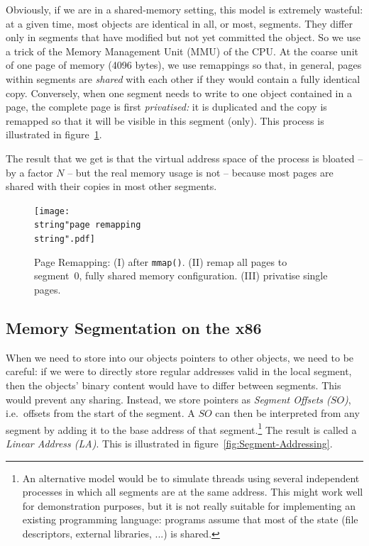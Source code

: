 \documentclass{sigplanconf}
\begin{document}
Obviously, if we are in a shared-memory setting, this model is extremely
wasteful: at a given time, most objects are identical in all, or most,
segments.  They differ only in segments that have modified but not yet
committed the object.  So we use a trick of the Memory Management Unit
(MMU) of the CPU.  At the coarse unit of one page of memory (4096
bytes), we use remappings so that, in general, pages within segments are
\emph{shared} with each other if they would contain a fully identical
copy.  Conversely, when one segment needs to write to one object
contained in a page, the complete page is first \emph{privatised:} it is
duplicated and the copy is remapped so that it will be visible in this
segment (only).  This process is illustrated in
figure~\ref{fig:Page-Remapping}.

The result that we get is that the virtual address space of the process
is bloated -- by a factor $N$ -- but the real memory usage is not --
because most pages are shared with their copies in most other segments.

\begin{figure}[h]
  \centering
  \texttt{[image: \\string"page remapping\\string".pdf]}
  \caption{Page Remapping: (I) after \texttt{mmap()}. (II) remap all pages to
    segment~0, fully shared memory configuration. (III) privatise single
    pages.\label{fig:Page-Remapping}}
\end{figure}


\subsection{Memory Segmentation on the x86}

When we need to store into our objects pointers to other objects, we
need to be careful: if we were to directly store regular addresses valid
in the local segment, then the objects' binary content would have to differ
between segments.  This would prevent any sharing.  Instead, we store
pointers as \emph{Segment Offsets ($SO$)}, i.e.\ offsets from the start
of the segment.  A $SO$ can then be interpreted from any segment by
adding it to the base address of that segment.\footnote{An alternative
model would be to simulate threads using several independent processes
in which all segments are at the same address.  This might work well for
demonstration purposes, but it is not really suitable for implementing
an existing programming language: programs assume that most of the state
(file descriptors, external libraries, ...) is shared.} The result is
called a \emph{Linear Address (LA)}. This is illustrated in
figure~\ref{fig:Segment-Addressing}.
\end{document}
